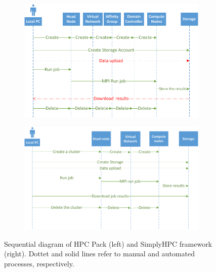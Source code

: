 \documentclass[3p,times]{elsarticle}
\begin{document}
\begin{figure}
\centering
\begin{subfigure}{.5\textwidth}
  \centering
			\includegraphics[width=\linewidth]{hpcPackSeq}	
  \label{fig:hpcg}
\end{subfigure}%
\begin{subfigure}{.5\textwidth}
  \centering
  \includegraphics[width=\linewidth]{simplyHpcSeq}
  \label{fig:cost}
\end{subfigure}
\caption{Sequential diagram of HPC Pack (left) and SimplyHPC framework (right). Dottet and solid lines refer to manual and automated processes, respectively.}
\label{fig:seqDiagram}
\end{figure}
\end{document}

